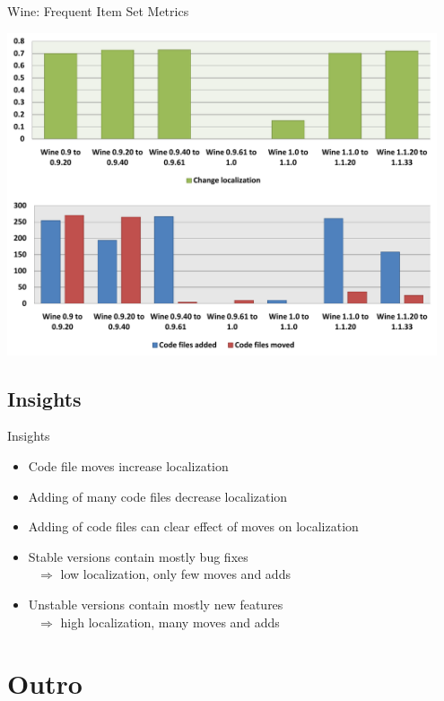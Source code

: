 \note{
}

\begin{frame}{Wine: Frequent Item Set Metrics}
  \begin{center}
    \includegraphics[width=0.95\textwidth]{minings/wine-fis-metrics}
  \end{center}
\end{frame}

\note{
}

\subsection{Insights}

\begin{frame}{Insights}
  \begin{itemize}
  \item Code file moves increase localization
  \item Adding of many code files decrease localization
  \item Adding of code files can clear effect of moves on localization
  \item Stable versions contain mostly bug fixes \\
    $\text{ }\Rightarrow$ low localization, only few moves and adds
  \item Unstable versions contain mostly new features \\
    $\text{ }\Rightarrow$ high localization, many moves and adds
  \end{itemize}
\end{frame}

\note{
}


\section*{Outro}

